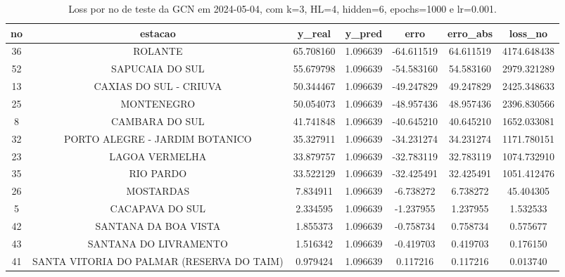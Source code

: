 \begin{table}[h]
\centering
\caption{Loss por no de teste da GCN em 2024-05-04, com k=3, HL=4, hidden=6, epochs=1000 e lr=0.001.}
\label{tab:gcn_loss_k3_hl4_h6_e1000_d20240504}
\begin{tabular}{ccccccc}
\toprule
no & estacao & y\_real & y\_pred & erro & erro\_abs & loss\_no \\
\midrule
36 & ROLANTE & 65.708160 & 1.096639 & -64.611519 & 64.611519 & 4174.648438 \\
52 & SAPUCAIA DO SUL & 55.679798 & 1.096639 & -54.583160 & 54.583160 & 2979.321289 \\
13 & CAXIAS DO SUL - CRIUVA & 50.344467 & 1.096639 & -49.247829 & 49.247829 & 2425.348633 \\
25 & MONTENEGRO & 50.054073 & 1.096639 & -48.957436 & 48.957436 & 2396.830566 \\
8 & CAMBARA DO SUL & 41.741848 & 1.096639 & -40.645210 & 40.645210 & 1652.033081 \\
32 & PORTO ALEGRE - JARDIM BOTANICO & 35.327911 & 1.096639 & -34.231274 & 34.231274 & 1171.780151 \\
23 & LAGOA VERMELHA & 33.879757 & 1.096639 & -32.783119 & 32.783119 & 1074.732910 \\
35 & RIO PARDO & 33.522129 & 1.096639 & -32.425491 & 32.425491 & 1051.412476 \\
26 & MOSTARDAS & 7.834911 & 1.096639 & -6.738272 & 6.738272 & 45.404305 \\
5 & CACAPAVA DO SUL & 2.334595 & 1.096639 & -1.237955 & 1.237955 & 1.532533 \\
42 & SANTANA DA BOA VISTA & 1.855373 & 1.096639 & -0.758734 & 0.758734 & 0.575677 \\
43 & SANTANA DO LIVRAMENTO & 1.516342 & 1.096639 & -0.419703 & 0.419703 & 0.176150 \\
41 & SANTA VITORIA DO PALMAR (RESERVA DO TAIM) & 0.979424 & 1.096639 & 0.117216 & 0.117216 & 0.013740 \\
\bottomrule
\end{tabular}
\end{table}
